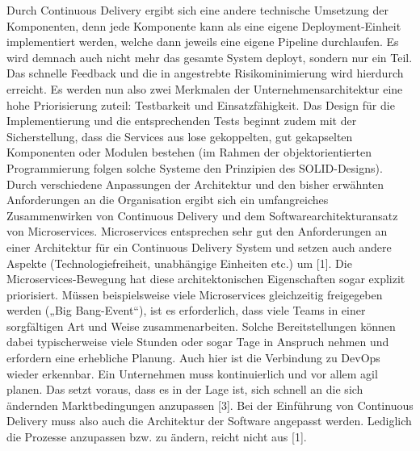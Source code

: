 Durch Continuous Delivery ergibt sich eine andere technische Umsetzung der Komponenten, denn jede Komponente kann als eine eigene Deployment-Einheit implementiert werden, welche dann jeweils eine eigene Pipeline durchlaufen. Es wird demnach auch nicht mehr das gesamte System deployt, sondern nur ein Teil. Das schnelle Feedback und die in angestrebte Risikominimierung wird hierdurch erreicht. Es werden nun also zwei Merkmalen der Unternehmensarchitektur eine hohe Priorisierung zuteil: Testbarkeit und Einsatzfähigkeit. Das Design für die Implementierung und die entsprechenden Tests beginnt zudem mit der Sicherstellung, dass die Services aus lose gekoppelten, gut gekapselten Komponenten oder Modulen bestehen (im Rahmen der objektorientierten Programmierung folgen solche Systeme den Prinzipien des SOLID-Designs). Durch verschiedene Anpassungen der Architektur und den bisher erwähnten Anforderungen an die Organisation ergibt sich ein umfangreiches Zusammenwirken von Continuous Delivery und dem Softwarearchitekturansatz von Microservices. Microservices entsprechen sehr gut den Anforderungen an einer Architektur für ein Continuous Delivery System und setzen auch andere Aspekte (Technologiefreiheit, unabhängige Einheiten etc.) um [1]. Die Microservices-Bewegung hat diese architektonischen Eigenschaften sogar explizit priorisiert. Müssen beispielsweise viele Microservices gleichzeitig freigegeben werden („Big Bang-Event“), ist es erforderlich, dass viele Teams in einer sorgfältigen Art und Weise zusammenarbeiten. Solche Bereitstellungen können dabei typischerweise viele Stunden oder sogar Tage in Anspruch nehmen und erfordern eine erhebliche Planung. Auch hier ist die Verbindung zu DevOps wieder erkennbar. Ein Unternehmen muss kontinuierlich und vor allem agil planen. Das setzt voraus, dass es in der Lage ist, sich schnell an die sich ändernden Marktbedingungen anzupassen [3]. Bei der Einführung von Continuous Delivery muss also auch die Architektur der Software angepasst werden. Lediglich die Prozesse anzupassen bzw. zu ändern, reicht nicht aus [1].


